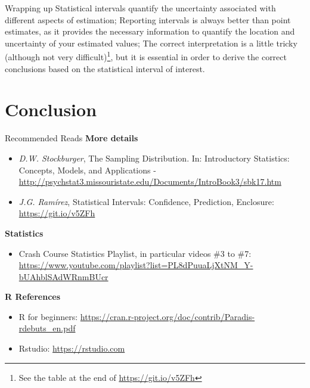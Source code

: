 
\begin{frame}{Wrapping up}
Statistical intervals quantify the uncertainty associated with different aspects of estimation;
\bigskip
Reporting intervals is always better than point estimates, as it provides the necessary information to quantify the location and uncertainty of your estimated values;
\bigskip
The correct interpretation is a little tricky (although not very difficult)\footnote{See the table at the end of  \url{https://git.io/v5ZFh}}, but it is essential in order to derive the correct conclusions based on the statistical interval of interest.
\end{frame}



\section{Conclusion}

\begin{frame}{Recommended Reads}
  {\bf More details}
  \begin{itemize}
    \item \emph{D.W. Stockburger}, The Sampling Distribution. In: Introductory Statistics: Concepts, Models, and Applications -
    \url{http://psychstat3.missouristate.edu/Documents/IntroBook3/sbk17.htm}
    \item \emph{J.G. Ramírez}, Statistical Intervals: Confidence, Prediction, Enclosure: \url{https://git.io/v5ZFh}
  \end{itemize}

  {\bf Statistics}
  \begin{itemize}
    \item Crash Course Statistics Playlist, in particular videos \#3 to \#7: \url{https://www.youtube.com/playlist?list=PL8dPuuaLjXtNM_Y-bUAhblSAdWRnmBUcr}
  \end{itemize}

  {\bf R References}
  \begin{itemize}
    \item R for beginners: \url{https://cran.r-project.org/doc/contrib/Paradis-rdebuts_en.pdf}
    \item Rstudio: \url{https://rstudio.com}
  \end{itemize}
\end{frame}
